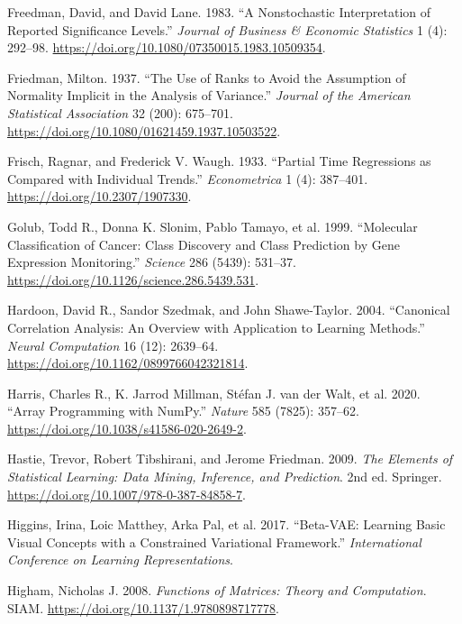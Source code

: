 \documentclass[
  10pt,
  letterpaper,
]{report}
\newlength{\cslhangindent}
\newenvironment{CSLReferences}[2] %
 {\begin{list}{}{%
  \setlength{\itemindent}{0pt}
  \setlength{\leftmargin}{0pt}
  \setlength{\parsep}{0pt}
  \ifodd #1
   \setlength{\leftmargin}{\cslhangindent}
   \setlength{\itemindent}{-1\cslhangindent}
  \fi
  \setlength{\itemsep}{#2\baselineskip}}}
 {\end{list}}
\begin{document}
\begin{CSLReferences}{1}{1}
Freedman, David, and David Lane. 1983. {``A Nonstochastic Interpretation
of Reported Significance Levels.''} \emph{Journal of Business \&
Economic Statistics} 1 (4): 292--98.
\url{https://doi.org/10.1080/07350015.1983.10509354}.

Friedman, Milton. 1937. {``The Use of Ranks to Avoid the Assumption of
Normality Implicit in the Analysis of Variance.''} \emph{Journal of the
American Statistical Association} 32 (200): 675--701.
\url{https://doi.org/10.1080/01621459.1937.10503522}.

Frisch, Ragnar, and Frederick V. Waugh. 1933. {``Partial Time
Regressions as Compared with Individual Trends.''} \emph{Econometrica} 1
(4): 387--401. \url{https://doi.org/10.2307/1907330}.

{Golub, Todd R., Donna K. Slonim, Pablo Tamayo, et al.} 1999.
{``Molecular Classification of Cancer: Class Discovery and Class
Prediction by Gene Expression Monitoring.''} \emph{Science} 286 (5439):
531--37. \url{https://doi.org/10.1126/science.286.5439.531}.

Hardoon, David R., Sandor Szedmak, and John Shawe-Taylor. 2004.
{``Canonical Correlation Analysis: An Overview with Application to
Learning Methods.''} \emph{Neural Computation} 16 (12): 2639--64.
\url{https://doi.org/10.1162/0899766042321814}.

{Harris, Charles R., K. Jarrod Millman, Stéfan J. van der Walt, et al.}
2020. {``Array Programming with {NumPy}.''} \emph{Nature} 585 (7825):
357--62. \url{https://doi.org/10.1038/s41586-020-2649-2}.

Hastie, Trevor, Robert Tibshirani, and Jerome Friedman. 2009. \emph{The
Elements of Statistical Learning: Data Mining, Inference, and
Prediction}. 2nd ed. Springer.
\url{https://doi.org/10.1007/978-0-387-84858-7}.

Higgins, Irina, Loic Matthey, Arka Pal, et al. 2017. {``Beta-{VAE}:
Learning Basic Visual Concepts with a Constrained Variational
Framework.''} \emph{International Conference on Learning
Representations}.

Higham, Nicholas J. 2008. \emph{Functions of Matrices: Theory and
Computation}. SIAM. \url{https://doi.org/10.1137/1.9780898717778}.


\end{CSLReferences}
\end{document}
